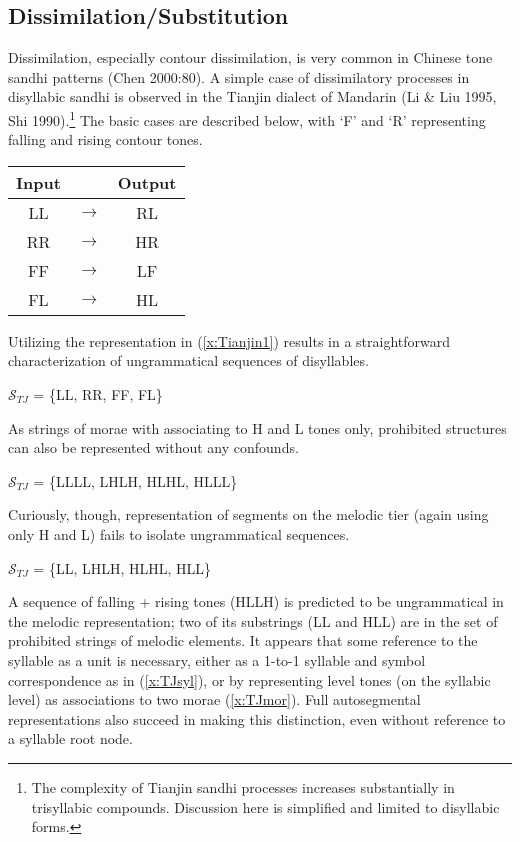 \documentclass{article}
\begin{document}
\subsection{Dissimilation/Substitution}
Dissimilation, especially contour dissimilation, is very common in Chinese tone sandhi patterns (Chen 2000:80). A simple case of dissimilatory processes in disyllabic sandhi is observed in the Tianjin dialect of Mandarin (Li \& Liu 1995, Shi 1990).\footnote{The complexity of Tianjin sandhi processes increases substantially in trisyllabic compounds. Discussion here is simplified and limited to disyllabic forms.} The basic cases are described below, with `F' and `R' representing falling and rising contour tones.
\begin{exe}
\ex
\label{x:Tianjin1}
\begin{tabular}[t]{ccc}
 Input && Output \\
 \hline
LL & $\rightarrow$ & RL \\
RR & $\rightarrow$ & HR \\
FF & $\rightarrow$ & LF \\
FL & $\rightarrow$ & HL \\
\end{tabular}
\end{exe}
Utilizing the representation in (\ref{x:Tianjin1}) results in a straightforward characterization of ungrammatical sequences of disyllables.
\begin{exe}
\ex
\label{x:TJsyl}
$\mathcal{S}_{TJ}$ = \{LL, RR, FF, FL\}
\end{exe} 
As strings of morae with associating to H and L tones only, prohibited structures can also be represented without any confounds.
\begin{exe}
\ex
\label{x:TJmor}
$\mathcal{S}_{TJ}$ = \{LLLL, LHLH, HLHL, HLLL\}
\end{exe} 
Curiously, though, representation of segments on the melodic tier (again using only H and L) fails to isolate ungrammatical sequences.
\begin{exe}
\ex
$\mathcal{S}_{TJ}$ = \{LL, LHLH, HLHL, HLL\}
\end{exe}
A sequence of falling + rising tones (HLLH) is predicted to be ungrammatical in the melodic representation; two of its substrings (LL and HLL) are in the set of prohibited strings of melodic elements. It appears that some reference to the syllable as a unit is necessary, either as a 1-to-1 syllable and symbol correspondence as in (\ref{x:TJsyl}), or by representing level tones (on the syllabic level) as associations to two morae (\ref{x:TJmor}). Full autosegmental representations also succeed in making this distinction, even without reference to a syllable root node.
\end{document}

